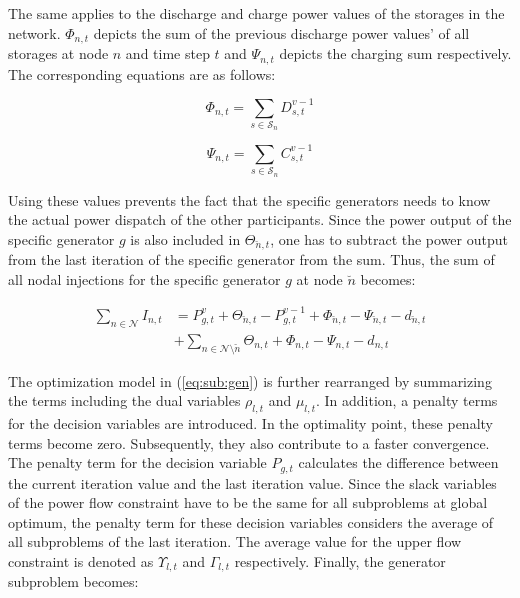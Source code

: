  The same applies to the discharge and charge power values of the storages in the network. $\Phi_{n,t}$ depicts the sum of the previous discharge power values' of all storages at node $n$ and time step $t$ and $\Psi_{n,t}$ depicts the charging sum respectively. The corresponding equations are as follows:
 
\begin{equation}
	\Phi_{n,t} = \sum_{s\in\mathcal{S}_n}D_{s,t}^{v-1}
\end{equation}

\begin{equation}
	\Psi_{n,t} = \sum_{s\in\mathcal{S}_n}C_{s,t}^{v-1}
\end{equation}
 
 Using these values prevents the fact that the specific generators needs to know the actual power dispatch of the other participants. Since the power output of the specific generator $g$ is also included in $\Theta_{\breve{n},t}$, one has to subtract the power output from the last iteration of the specific generator from the sum. Thus, the sum of all nodal injections for the specific generator $g$ at node $\breve{n}$ becomes: 

 \begin{align}
 	\sum_{n \in \mathcal{N}} I_{n,t} &= P_{g,t}^v + \Theta_{\breve{n},t} - P_{g,t}^{v-1} + \Phi_{\breve{n},t} - \Psi_{\breve{n},t} - d_{\breve{n},t} \\
 	& + \sum_{n \in \mathcal{N} \setminus \breve{n}} \Theta_{n,t} + \Phi_{n,t} - \Psi_{n,t} - d_{n,t} \nonumber
 \end{align}
 
 The optimization model in (\ref{eq:sub:gen}) is further rearranged by summarizing the terms including the dual variables $\rho_{l,t}$ and $\mu_{l,t}$. In addition, a penalty terms for the decision variables are introduced. In the optimality point, these penalty terms become zero. Subsequently, they also contribute to a faster convergence. The penalty term for the decision variable $P_{g,t}$ calculates the difference between the current iteration value and the last iteration value. Since the slack variables of the power flow constraint have to be the same for all subproblems at global optimum, the penalty term for these decision variables considers the average of all subproblems of the last iteration. The average value for the upper flow constraint is denoted as $\Upsilon_{l,t}$ and $\Gamma_{l,t}$ respectively. Finally, the generator subproblem becomes:
 
